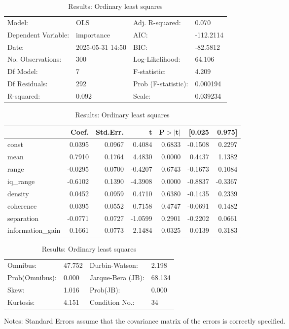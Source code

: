 \begin{table}
\caption{Results: Ordinary least squares}
\label{}
\begin{center}
\begin{tabular}{llll}
\hline
Model:              & OLS              & Adj. R-squared:     & 0.070      \\
Dependent Variable: & importance       & AIC:                & -112.2114  \\
Date:               & 2025-05-31 14:50 & BIC:                & -82.5812   \\
No. Observations:   & 300              & Log-Likelihood:     & 64.106     \\
Df Model:           & 7                & F-statistic:        & 4.209      \\
Df Residuals:       & 292              & Prob (F-statistic): & 0.000194   \\
R-squared:          & 0.092            & Scale:              & 0.039234   \\
\hline
\end{tabular}
\end{center}

\begin{center}
\begin{tabular}{lrrrrrr}
\hline
                  &   Coef. & Std.Err. &       t & P$> |$t$|$ &  [0.025 &  0.975]  \\
\hline
const             &  0.0395 &   0.0967 &  0.4084 &      0.6833 & -0.1508 &  0.2297  \\
mean              &  0.7910 &   0.1764 &  4.4830 &      0.0000 &  0.4437 &  1.1382  \\
range             & -0.0295 &   0.0700 & -0.4207 &      0.6743 & -0.1673 &  0.1084  \\
iq\_range         & -0.6102 &   0.1390 & -4.3908 &      0.0000 & -0.8837 & -0.3367  \\
density           &  0.0452 &   0.0959 &  0.4710 &      0.6380 & -0.1435 &  0.2339  \\
coherence         &  0.0395 &   0.0552 &  0.7158 &      0.4747 & -0.0691 &  0.1482  \\
separation        & -0.0771 &   0.0727 & -1.0599 &      0.2901 & -0.2202 &  0.0661  \\
information\_gain &  0.1661 &   0.0773 &  2.1484 &      0.0325 &  0.0139 &  0.3183  \\
\hline
\end{tabular}
\end{center}

\begin{center}
\begin{tabular}{llll}
\hline
Omnibus:       & 47.752 & Durbin-Watson:    & 2.198   \\
Prob(Omnibus): & 0.000  & Jarque-Bera (JB): & 68.134  \\
Skew:          & 1.016  & Prob(JB):         & 0.000   \\
Kurtosis:      & 4.151  & Condition No.:    & 34      \\
\hline
\end{tabular}
\end{center}
\end{table}
\bigskip
Notes: \newline 
[1] Standard Errors assume that the covariance matrix of the errors is correctly specified.